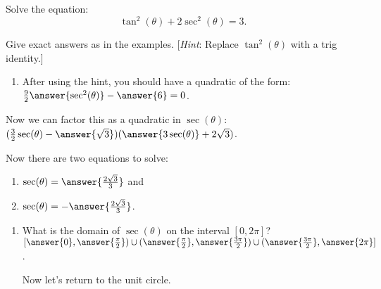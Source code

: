 \documentclass{ximera}
\author{Elizabeth Campolongo}
\begin{document}
\begin{exercise}
Solve the equation:
$$\tan^2(\theta) + 2\sec^2(\theta)=3.$$

Give exact answers as in the examples. [\textit{Hint}: Replace $\tan^2(\theta)$ with a trig identity.]

\begin{enumerate}
\item After using the hint, you should have a quadratic of the form: \smallskip\\

 $\frac{9}{2}\answer{\sec^2(\theta)} -\answer{6} = 0$.
 \end{enumerate}
\begin{exercise}
Now we can factor this as a quadratic in $\sec(\theta)$: \smallskip\\
$(\frac{3}{2}\sec(\theta) - \answer{\sqrt{3}})(\answer{3\sec(\theta)} + 2\sqrt{3})$.

\begin{exercise}
Now there are two equations to solve:
\begin{enumerate}
\item $\sec(\theta) = \answer{\frac{2\sqrt{3}}{3}}$ and

\item $\sec(\theta) = -\answer{\frac{2\sqrt{3}}{3}}$.
\end{enumerate}

\begin{exercise}
\begin{enumerate}
\item What is the domain of $\sec(\theta)$ on the interval $[0, 2\pi]$?\smallskip \\
$[\answer{0},\answer{\frac{\pi}{2}}) \cup (\answer{\frac{\pi}{2}}, \answer{\frac{3\pi}{2}}) \cup (\answer{\frac{3\pi}{2}},\answer{2\pi}]$.


\bigskip
Now let's return to the unit circle. 
\begin{image}
\end{image}
\end{enumerate}
\end{exercise}
\end{exercise}
\end{exercise}
\end{exercise}
\end{document}
